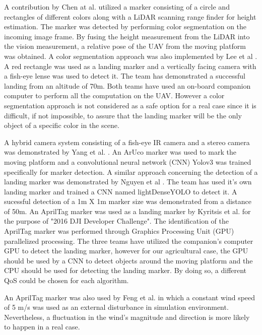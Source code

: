 \documentclass[conference]{IEEEtran}
\begin{document}
A contribution by Chen at al. \cite{chen2016system} utilized a marker consisting of a circle and rectangles of different colors along with a LiDAR scanning range finder for height estimation. The marker was detected by performing color segmentation on the incoming image frame. By fusing the height measurement from the LiDAR into the vision measurement, a relative pose of the UAV from the moving platform was obtained. A color segmentation approach was also implemented by Lee et al \cite{lee2016vision}. A red rectangle was used as a landing marker and a vertically facing camera with a fish-eye lense was used to detect it. The team has demonstrated a successful landing from an altitude of 70m. Both teams have used an on-board companion computer to perform all the computation on the UAV. However a color segmentation approach is not considered as a safe option for a real case since it is difficult, if not impossible, to assure that the landing marker will be the only object of a specific color in the scene.

A hybrid camera system consisting of a fish-eye IR camera and a stereo camera was demonstrated by Yang et al. \cite{yang2018hybrid}. An ArUco marker was used to mark the moving platform and a convolutional neural network (CNN) Yolov3 was trained specifically for marker detection. A similar approach concerning the detection of a landing marker was demonstrated by Nguyen et al \cite{nguyen2018lightdenseyolo}. The team has used it's own landing marker and trained a CNN named lightDenseYOLO to detect it. A sucessful detection of a 1m X 1m marker size was demonstrated from a distance of 50m. An AprilTag marker was used as a landing marker by Kyritsis et al. \cite{kyristsis2016towards} for the purpose of "2016 DJI Developer Challenge". The identification of the AprilTag marker was performed through Graphics Processing Unit (GPU) parallelized processing. The three teams have utilized the companion's computer GPU to detect the landing marker, however for our agricultural case, the GPU should be used by a CNN to detect objects around the moving platform and the CPU should be used for detecting the landing marker. By doing so, a different QoS could be chosen for each algorithm.    

An AprilTag marker was also used by Feng et al. \cite{feng2018autonomous} in which a constant wind speed of 5 m/s was used as an external disturbance in simulation environment. Nevertheless, a fluctuation in the wind's magnitude and direction is more likely to happen in a real case.
\end{document}
